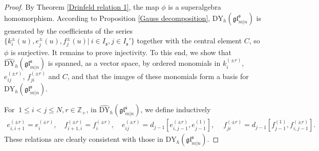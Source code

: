 \documentclass[a4paper,12pt]{article}
\numberwithin{equation}{section}
\begin{document}
\begin{proof}
By Theorem \ref{Drinfeld relation 1}, the map $\phi$ is a superalgebra homomorphism. According to Proposition \ref{Gauss decomposition},  $\mathrm{DY}_{h}(\mathfrak{gl}^{\mathfrak{s}}_{m|n})$ is generated by the coefficients of the series $\{k_{i}^{\pm}(u), e_{j}^{\pm}(u), f_{j}^{\pm}(u)|~i\in I_{\mathfrak{s}}, j\in I_{\mathfrak{s}}'\}$ together with the central element $C$, so $\phi$ is surjective. It remains to prove injectivity. To this end, we show that $\widehat{\mathrm{DY}}_{h}(\mathfrak{gl}^{\mathfrak{s}}_{m|n})$ is spanned, as a vector space, by ordered monomials in $k_{i}^{(\pm r)}$, $e_{ij}^{(\pm r)}$, $f_{ji}^{(\pm r)}$ and $C$, and that the images of these monomials form a basis for $\mathrm{DY}_{h}(\mathfrak{gl}^{\mathfrak{s}}_{m|n})$.

For $~1\leq i<j\leq N, r\in\mathbb{Z}_{+}$, in $\widehat{\mathrm{DY}}_{h}(\mathfrak{gl}^{\mathfrak{s}}_{m|n})$, we define  inductively  
\begin{align*}
e_{i,i+1}^{(\pm r)}=e_{i}^{(\pm r)}, \quad f_{i+1,i}^{(\pm r)}=f_{i}^{(\pm r)},\quad e_{ij}^{(\pm r)}=d_{j-1}\left[e_{i,j-1}^{(\pm r)},e_{j-1}^{(1)}\right],\quad~
f_{ji}^{(\pm r)}=d_{j-1}\left[f_{j-1}^{(1)},f_{i,j-1}^{(\pm r)}\right].
\end{align*}
These relations are clearly consistent with those in $\mathrm{DY}_{h}(\mathfrak{gl}^{\mathfrak{s}}_{m|n})$.


\end{proof}
\end{document}
